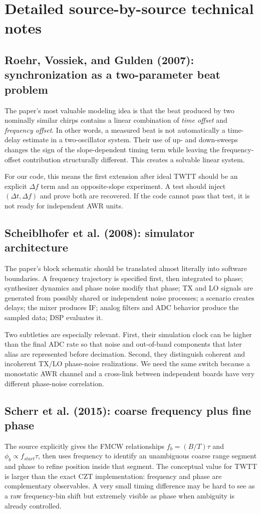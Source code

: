 \documentclass[11pt]{article}
\begin{document}
\clearpage
\section{Detailed source-by-source technical notes}
\subsection{Roehr, Vossiek, and Gulden (2007): synchronization as a two-parameter beat problem}
The paper's most valuable modeling idea is that the beat produced by two nominally similar chirps contains a linear combination of \emph{time offset} and \emph{frequency offset}. In other words, a measured beat is not automatically a time-delay estimate in a two-oscillator system. Their use of up- and down-sweeps changes the sign of the slope-dependent timing term while leaving the frequency-offset contribution structurally different. This creates a solvable linear system.

For our code, this means the first extension after ideal TWTT should be an explicit $\Delta f$ term and an opposite-slope experiment. A test should inject $(\Delta t,\Delta f)$ and prove both are recovered. If the code cannot pass that test, it is not ready for independent AWR units.

\subsection{Scheiblhofer et al. (2008): simulator architecture}
The paper's block schematic should be translated almost literally into software boundaries. A frequency trajectory is specified first, then integrated to phase; synthesizer dynamics and phase noise modify that phase; TX and LO signals are generated from possibly shared or independent noise processes; a scenario creates delays; the mixer produces IF; analog filters and ADC behavior produce the sampled data; DSP evaluates it.

Two subtleties are especially relevant. First, their simulation clock can be higher than the final ADC rate so that noise and out-of-band components that later alias are represented before decimation. Second, they distinguish coherent and incoherent TX/LO phase-noise realizations. We need the same switch because a monostatic AWR channel and a cross-link between independent boards have very different phase-noise correlation.

\subsection{Scherr et al. (2015): coarse frequency plus fine phase}
The source explicitly gives the FMCW relationships $f_b=(B/T)\tau$ and $\phi_b\propto f_{start}\tau$, then uses frequency to identify an unambiguous coarse range segment and phase to refine position inside that segment. The conceptual value for TWTT is larger than the exact CZT implementation: frequency and phase are complementary observables. A very small timing difference may be hard to see as a raw frequency-bin shift but extremely visible as phase when ambiguity is already controlled.
\end{document}
